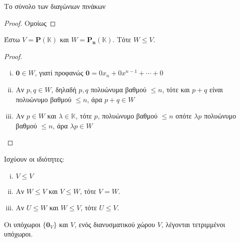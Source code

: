 \begin{example}
    \textcolor{Col2}{Το σύνολο των διαγώνιων πινάκων}

    \begin{proof}
        Ομοίως
    \end{proof}
\end{example}

\begin{example}
\item Έστω $ V = \mathbf{P}(\mathbb{K}) $ και 
    $ W = \mathbf{P_{n}}(\mathbb{K})$.  Τότε $ W \leq V $.  
    \begin{proof}
    \item {}
        \begin{enumerate}[i)]
            \item   $ \mathbf{0} \in W $, γιατί προφανώς 
                $ \mathbf{0} = 0 x_{n} + 0 x^{n-1} + \cdots + 0 $
            \item 
                Αν $ p, q \in W $, δηλαδή $ p,q $ πολυώνυμα βαθμού $ \leq n $, 
                τότε και $ p+q $ είναι πολυώνυμο βαθμού $ \leq n $, άρα 
                $p+q \in W$
            \item Αν $ p \in W $ και $ \lambda \in \mathbb{K} $, τότε 
                $p$, πολυώνυμο βαθμού $ \leq n $ οπότε $ \lambda p$ πολυώνυμο 
                βαθμού $ \leq n $, άρα $ \lambda p \in W $
        \end{enumerate}
    \end{proof}
\end{example}

\begin{prop}
    Ισχύουν οι ιδιότητες:
    \begin{enumerate}[i)]
        \item $ V \leq V $
        \item Αν $ W \leq V $ και $ V \leq W $, τότε $ V = W $.
        \item Αν $ U \leq W $ και $ W \leq V $, τότε $ U \leq V $.
    \end{enumerate}
\end{prop}

\begin{rem}
    Οι υπόχωροι $ \{ \mathbf{0}_{V} \} $ και $V$, ενός διανυσματικού χώρου $V$, 
    λέγονται \textcolor{Col2}{τετριμμένοι υπόχωροι}.
\end{rem}


